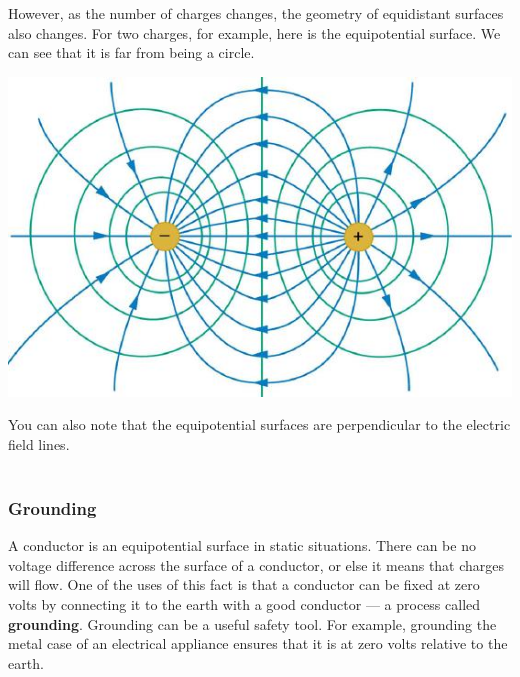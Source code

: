 \documentclass[9pt]{article}
\begin{document}
	However, as the number of charges changes, the geometry of equidistant surfaces also changes. For two charges, for example, here is the equipotential surface. We can see that it is far from being a circle. \begin{center}
		\includegraphics[scale=0.27]{equip_2}
	\end{center}
	You can also note that the equipotential surfaces are perpendicular to the electric field lines. \\ \\
	\subsubsection*{Grounding}
	A conductor is an equipotential surface in static situations. There can be no voltage difference across the surface of a conductor, or else it means that charges will flow. One of the uses of this fact is that a conductor can be fixed at zero volts by connecting it to the earth with a good conductor — a process called \textbf{grounding}. Grounding can be a useful safety tool. For example, grounding the metal case of an electrical appliance ensures that it is at zero volts relative to the earth.
	
	
\end{document}
